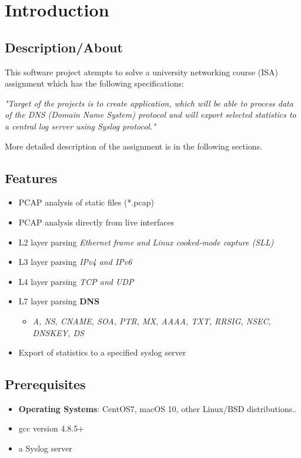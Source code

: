 

\section{Introduction}

\subsection{Description/About}

This software project atempts to solve a university networking course (ISA) assignment
which has the following specifications:

\textit{"Target of the projects is to create application, which will be able to process data of the DNS (Domain Name System)
protocol and will export selected statistics to a central log server using Syslog protocol."}

More detailed description of the assignment is in the following sections.

\subsection{Features}

\begin{itemize}
\item PCAP analysis of static files (*.pcap)
\item PCAP analysis directly from live interfaces
\item L2 layer parsing \textit{Ethernet frame and Linux cooked-mode capture (SLL)}
\item L3 layer parsing \textit{IPv4 and IPv6}
\item L4 layer parsing \textit{TCP and UDP}
\item L7 layer parsing \textbf{DNS}
    \begin{itemize}
    \item \textit{A, NS, CNAME, SOA, PTR, MX, AAAA, TXT, RRSIG, NSEC, DNSKEY, DS}
    \end{itemize}
\item Export of statistics to a specified syslog server
\end{itemize} 
\subsection{Prerequisites}

\begin{itemize}

\item \textbf{Operating Systems}: CentOS7, macOS 10, other Linux/BSD distributions..
\item gcc version 4.8.5+
\item a Syslog server

\end{itemize}


